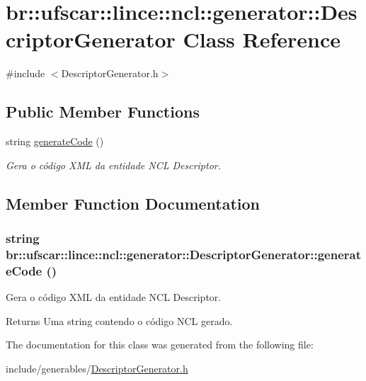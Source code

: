 \hypertarget{classbr_1_1ufscar_1_1lince_1_1ncl_1_1generator_1_1DescriptorGenerator}{
\section{br::ufscar::lince::ncl::generator::DescriptorGenerator Class Reference}
\label{classbr_1_1ufscar_1_1lince_1_1ncl_1_1generator_1_1DescriptorGenerator}
}


{\ttfamily \#include $<$DescriptorGenerator.h$>$}

\subsection*{Public Member Functions}
\begin{DoxyCompactItemize}
\item 
string \hyperlink{classbr_1_1ufscar_1_1lince_1_1ncl_1_1generator_1_1DescriptorGenerator_a5f0afe58ec38c939395c5475a0e39543}{generateCode} ()
\begin{DoxyCompactList}\small\item\em Gera o código XML da entidade NCL Descriptor. \item\end{DoxyCompactList}\end{DoxyCompactItemize}


\subsection{Member Function Documentation}
\hypertarget{classbr_1_1ufscar_1_1lince_1_1ncl_1_1generator_1_1DescriptorGenerator_a5f0afe58ec38c939395c5475a0e39543}{
\subsubsection[{generateCode}]{\setlength{\rightskip}{0pt plus 5cm}string br::ufscar::lince::ncl::generator::DescriptorGenerator::generateCode ()}}
\label{classbr_1_1ufscar_1_1lince_1_1ncl_1_1generator_1_1DescriptorGenerator_a5f0afe58ec38c939395c5475a0e39543}


Gera o código XML da entidade NCL Descriptor. 

\begin{DoxyReturn}{Returns}
Uma string contendo o código NCL gerado. 
\end{DoxyReturn}


The documentation for this class was generated from the following file:\begin{DoxyCompactItemize}
\item 
include/generables/\hyperlink{DescriptorGenerator_8h}{DescriptorGenerator.h}\end{DoxyCompactItemize}
